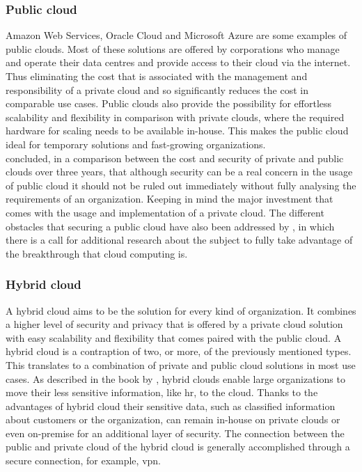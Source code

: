 \subsubsection{Public cloud}
Amazon Web Services, Oracle Cloud and Microsoft Azure are some examples of public clouds. Most of these solutions are offered by corporations who manage and operate their data centres and provide access to their cloud via the internet. Thus eliminating the cost that is associated with the management and responsibility of a private cloud and so significantly reduces the cost in comparable use cases. Public clouds also provide the possibility for effortless scalability and flexibility in comparison with private clouds, where the required hardware for scaling needs to be available in-house. This makes the public cloud ideal for temporary solutions and fast-growing organizations.
\\
\textcite{Singh2012} concluded, in a comparison between the cost and security of private and public clouds over three years, that although security can be a real concern in the usage of public cloud it should not be ruled out immediately without fully analysing the requirements of an organization. Keeping in mind the major investment that comes with the usage and implementation of a private cloud.  
The different obstacles that securing a public cloud have also been addressed by \textcite{Ren2012}, in which there is a call for additional research about the subject to fully take advantage of the breakthrough that cloud computing is. 

\subsubsection{Hybrid cloud}
A hybrid cloud aims to be the solution for every kind of organization. It combines a higher level of security and privacy that is offered by a private cloud solution with easy scalability and flexibility that comes paired with the public cloud. A hybrid cloud is a contraption of two, or more, of the previously mentioned types. This translates to a combination of private and public cloud solutions in most use cases. As described in the book by \textcite{Sarna2010}, hybrid clouds enable large organizations to move their less sensitive information, like \acrfull{hr}, to the cloud. Thanks to the advantages of hybrid cloud their sensitive data, such as classified information about customers or the organization, can remain in-house on private clouds or even on-premise for an additional layer of security. The connection between the public and private cloud of the hybrid cloud is generally accomplished through a secure connection, for example, \acrfull{vpn}.

